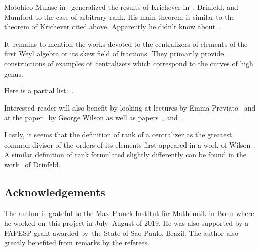 \documentclass[pdftex]{sigma}
\numberwithin{equation}{section}
\begin{document}
Motohico Mulase in~\cite{Mul} generalized the results of Krichever in~\cite{K1}, Drinfeld, and Mumford to the case of arbitrary rank. His main theorem is similar to the theorem of Krichever cited above.
Apparently he didn't know about~\cite{K3}.

It~remains to mention the works devoted to the centralizers of elements of the first Weyl algebra or its skew field of fractions. They primarily provide constructions of examples of~centralizers which correspond to the curves of high genus.

Here is a partial list:~\cite{DM, De, Gri, Gru, Mi6, Mi5, Mi4, Mi3, Mi2, Mi1, MZ, Mo1, Mo3, Mo2, Mo4, O1, O2, O4, O3, P2, ZM, ZMS}.

Interested reader will also benefit by looking at lectures by Emma Previato~\cite{P1} and at the paper~\cite{W3} by George Wilson as well as papers~\cite{SW, V, W2}, and~\cite{BZ}.

Lastly, it seems that the definition of rank of a centralizer as the greatest common divisor of the orders of its elements first appeared in a work of Wilson~\cite{W1}. A similar definition of rank formulated slightly differently can be found in the work~\cite{Dr} of Drinfeld.

\subsection*{Acknowledgements}

The author is grateful to the Max-Planck-Institut f\"{u}r Mathemtik in Bonn where he worked on~this project in July--August of 2019.
He was also supported by a FAPESP grant awarded by~the State of Sao Paulo, Brazil.
The author also greatly benefited from remarks by the referees.
\end{document}
